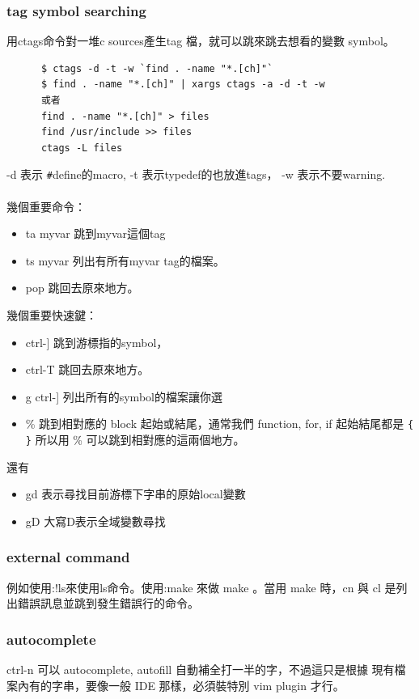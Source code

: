       \subsubsection{tag symbol searching}
      用ctags命令對一堆c sources產生tag 檔，就可以跳來跳去想看的變數 symbol。
      \begin{verbatim}
      $ ctags -d -t -w `find . -name "*.[ch]"`
      $ find . -name "*.[ch]" | xargs ctags -a -d -t -w
      或者
      find . -name "*.[ch]" > files
      find /usr/include >> files
      ctags -L files
      \end{verbatim}
      -d 表示 \verb=#=define的macro, -t 表示typedef的也放進tags，
      -w 表示不要warning.
      \\\\
      幾個重要命令：
      \begin{itemize}
        \item ta myvar 跳到myvar這個tag
        \item ts myvar 列出有所有myvar tag的檔案。
        \item pop 跳回去原來地方。
      \end{itemize}
      幾個重要快速鍵：
      \begin{itemize}
        \item ctrl-] 跳到游標指的symbol，
        \item ctrl-T 跳回去原來地方。
        \item g ctrl-] 列出所有的symbol的檔案讓你選
        \item \% 跳到相對應的 block 起始或結尾，通常我們 function, for, if
          起始結尾都是 \verb={ }= 所以用 \% 可以跳到相對應的這兩個地方。
      \end{itemize}
      還有
      \begin{itemize}
        \item gd 表示尋找目前游標下字串的原始local變數
        \item gD 大寫D表示全域變數尋找
      \end{itemize}

      \subsubsection{external command}
      例如使用:!ls來使用ls命令。使用:make 來做 make 。當用 make 時，cn
      與 cl 是列出錯誤訊息並跳到發生錯誤行的命令。

      \subsubsection{autocomplete}
      ctrl-n 可以 autocomplete, autofill 自動補全打一半的字，不過這只是根據
      現有檔案內有的字串，要像一般 IDE 那樣，必須裝特別 vim plugin 才行。

